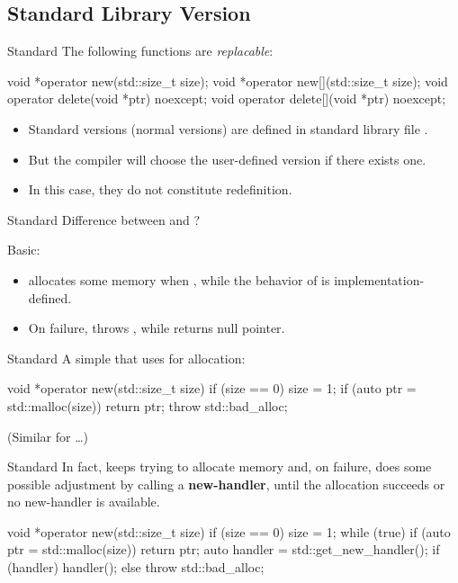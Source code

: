 \documentclass{beamer}
\begin{document}
\subsection{Standard Library Version}

\begin{frame}[fragile]{Standard }
  The following functions are \textit{replacable}:
  \begin{cpp}
void *operator new(std::size_t size);
void *operator new[](std::size_t size);
void operator delete(void *ptr) noexcept;
void operator delete[](void *ptr) noexcept;
  \end{cpp}
  \begin{itemize}
    \item Standard versions (normal versions) are defined in standard library file .
    \item But the compiler will choose the user-defined version if there exists one.
    \item In this case, they do not constitute redefinition.
  \end{itemize}
\end{frame}

\begin{frame}{Standard }
  Difference between  and ?
  \pause
  \par Basic:
  \begin{itemize}
    \item {} allocates some memory when , while the behavior of  is implementation-defined.
    \item On failure,  throws , while  returns null pointer.
  \end{itemize}
\end{frame}

\begin{frame}[fragile]{Standard }
  A simple  that uses  for allocation:
  \begin{cpp}
void *operator new(std::size_t size) {
  if (size == 0)
    size = 1;
  if (auto ptr = std::malloc(size))
    return ptr;
  throw std::bad_alloc{};
}
  \end{cpp}
  (Similar for \dots)
\end{frame}

\begin{frame}[fragile]{Standard }
  In fact,  keeps trying to allocate memory and, on failure, does some possible adjustment by calling a \textbf{new-handler}, until the allocation succeeds or no new-handler is available.
  \begin{cpp}[\scriptsize]
void *operator new(std::size_t size) {
  if (size == 0)
    size = 1;
  while (true) {
    if (auto ptr = std::malloc(size))
      return ptr;
    auto handler = std::get_new_handler();
    if (handler)
      handler();
    else
      throw std::bad_alloc{};
  }
}
  \end{cpp}
\end{frame}
\end{document}
